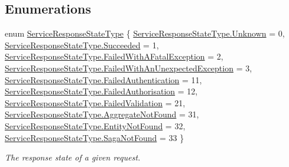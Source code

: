 \subsection*{Enumerations}
\begin{DoxyCompactItemize}
\item 
enum \hyperlink{namespaceCqrs_1_1Services_a41411b784c4fcb7eed0cef2a5b522de0_a41411b784c4fcb7eed0cef2a5b522de0}{Service\+Response\+State\+Type} \{ \newline
\hyperlink{namespaceCqrs_1_1Services_a41411b784c4fcb7eed0cef2a5b522de0_a41411b784c4fcb7eed0cef2a5b522de0a88183b946cc5f0e8c96b2e66e1c74a7e}{Service\+Response\+State\+Type.\+Unknown} = 0, 
\hyperlink{namespaceCqrs_1_1Services_a41411b784c4fcb7eed0cef2a5b522de0_a41411b784c4fcb7eed0cef2a5b522de0a66d02c2f8a582446f8dd8752366002b5}{Service\+Response\+State\+Type.\+Succeeded} = 1, 
\hyperlink{namespaceCqrs_1_1Services_a41411b784c4fcb7eed0cef2a5b522de0_a41411b784c4fcb7eed0cef2a5b522de0adf356d2a26b9021bbf29a4c477ba6534}{Service\+Response\+State\+Type.\+Failed\+With\+A\+Fatal\+Exception} = 2, 
\hyperlink{namespaceCqrs_1_1Services_a41411b784c4fcb7eed0cef2a5b522de0_a41411b784c4fcb7eed0cef2a5b522de0a485362764734183da5fc0c43da6d4648}{Service\+Response\+State\+Type.\+Failed\+With\+An\+Unexpected\+Exception} = 3, 
\newline
\hyperlink{namespaceCqrs_1_1Services_a41411b784c4fcb7eed0cef2a5b522de0_a41411b784c4fcb7eed0cef2a5b522de0a0e67fb99f2a0d54965191d09312d347a}{Service\+Response\+State\+Type.\+Failed\+Authentication} = 11, 
\hyperlink{namespaceCqrs_1_1Services_a41411b784c4fcb7eed0cef2a5b522de0_a41411b784c4fcb7eed0cef2a5b522de0ad80139b7a01b796769d7d7e9744b656c}{Service\+Response\+State\+Type.\+Failed\+Authorisation} = 12, 
\hyperlink{namespaceCqrs_1_1Services_a41411b784c4fcb7eed0cef2a5b522de0_a41411b784c4fcb7eed0cef2a5b522de0ab200ca8ee3861d3b22d05cf046935d62}{Service\+Response\+State\+Type.\+Failed\+Validation} = 21, 
\hyperlink{namespaceCqrs_1_1Services_a41411b784c4fcb7eed0cef2a5b522de0_a41411b784c4fcb7eed0cef2a5b522de0ace476dac8be7afb33ba2dae45bc65ea1}{Service\+Response\+State\+Type.\+Aggregate\+Not\+Found} = 31, 
\newline
\hyperlink{namespaceCqrs_1_1Services_a41411b784c4fcb7eed0cef2a5b522de0_a41411b784c4fcb7eed0cef2a5b522de0a5f190a8ae233f14fa32f38fce84aed7e}{Service\+Response\+State\+Type.\+Entity\+Not\+Found} = 32, 
\hyperlink{namespaceCqrs_1_1Services_a41411b784c4fcb7eed0cef2a5b522de0_a41411b784c4fcb7eed0cef2a5b522de0ac3ccc686dc56ccffeeec7d6d670c8a46}{Service\+Response\+State\+Type.\+Saga\+Not\+Found} = 33
 \}\begin{DoxyCompactList}\small\item\em The response state of a given request. \end{DoxyCompactList}
\end{DoxyCompactItemize}


